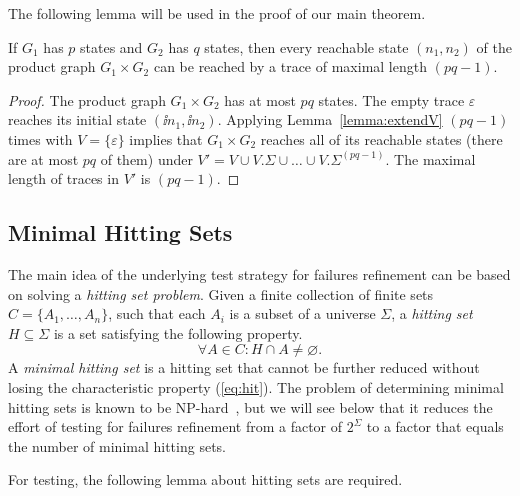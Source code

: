 The following lemma will be used in the proof of our main theorem.
\begin{lemma}\label{lemma:reachproduc}
If $G_1$ has $p$ states and $G_2$ has $q$ states, then every reachable state
$(n_1,n_2)$ of the product graph $G_1\times G_2$ can be reached by a trace
of maximal length $(pq-1)$.
\end{lemma}
\begin{proof}
The product graph $G_1\times G_2$ has at most $pq$ states. The empty trace $\varepsilon$
reaches its initial state $(\ii n_1,\ii n_2)$. Applying Lemma~\ref{lemma:extendV}
$(pq-1)$ times with $V=\{\varepsilon \}$ implies that $G_1\times G_2$ reaches
all of its reachable states (there are at most $pq$ of them) under
$V' = V \cup V.\Sigma\cup\dots \cup V.\Sigma^{(pq-1)}$. The maximal length of traces in
$V'$ is $(pq-1)$.
\xbox
\end{proof}


\subsection{Minimal Hitting Sets}
\label{sec:hit}

The main idea of the underlying test strategy for failures refinement can be
based on solving a \emph{hitting set problem}. Given a finite collection of
finite sets $C = \{ A_1,\dots,A_n\}$, such that each $A_i$ is a subset of a
universe $\Sigma$, a \emph{hitting set} $H\subseteq\Sigma$ is a set
satisfying the following property.
%
\begin{equation}
  \label{eq:hit}
  \forall A\in C: H\cap A \neq\varnothing.
\end{equation}
%
A \emph{minimal hitting set} is a hitting set that cannot be further reduced
without losing the characteristic property (\ref{eq:hit}). The problem of
determining minimal hitting sets is known to be
NP-hard~\cite{Book1975-BOOKRM}, but we will see below that it reduces the
effort of testing for failures refinement from a factor of $2^\Sigma$ to a
factor that equals the number of minimal hitting sets.

For testing, the following lemma about hitting sets are required.

